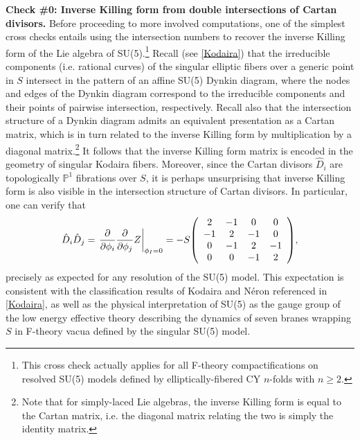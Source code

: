 \documentclass[11pt,oneside,english]{article}
\numberwithin{equation}{section}
\let\originalleft\left
\let\originalright\right
\renewcommand*{\left}{\mathopen{}\mathclose\bgroup\originalleft}
\renewcommand*{\right}{\aftergroup\egroup\originalright}
\theoremstyle{definition}
\begin{document}
\noindent \textbf{Check \#0: Inverse Killing form from double intersections of Cartan divisors.} Before proceeding to more involved computations, one of the simplest cross checks entails using the intersection numbers to recover the inverse Killing form of the Lie algebra of SU(5).\footnote{This cross check actually applies for all F-theory compactifications on resolved SU(5) models defined by elliptically-fibered CY $n$-folds with $n\geq 2$.} Recall (see \cref{Kodaira}) that the irreducible components (i.e. rational curves) of the singular elliptic fibers over a generic point in $S$ intersect in the pattern of an affine SU(5) Dynkin diagram, where the nodes and edges of the Dynkin diagram correspond to the irreducible components and their points of pairwise intersection, respectively. Recall also that the intersection structure of a Dynkin diagram admits an equivalent presentation as a Cartan matrix, which is in turn related to the inverse Killing form by multiplication by a diagonal matrix.\footnote{Note that for simply-laced Lie algebras, the inverse Killing form is equal to the Cartan matrix, i.e. the diagonal matrix relating the two is simply the identity matrix.} It follows that the inverse Killing form matrix is encoded in the geometry of singular Kodaira fibers. Moreover, since the Cartan divisors $\hat D_i$ are topologically $\mathbb P^1$ fibrations over $S$, it is perhaps unsurprising that inverse Killing form is also visible in the intersection structure of Cartan divisors. In particular, one can verify that
	\begin{align}
		 \hat D_{i}  \hat D_j=  \left.\frac{\partial}{\partial \phi_i} \frac{\partial}{\partial \phi_j} Z\right|_{\phi_I=0} =- S\left(
\begin{array}{cccc}
 2 & -1 & 0 & 0 \\
 -1 & 2 & -1 & 0 \\
 0 & -1 & 2 & -1 \\
 0 & 0 & -1 & 2 \\
\end{array}
\right),
	\end{align}
precisely as expected for any resolution of the SU(5) model. This expectation is consistent with the classification results of Kodaira and N\'eron referenced in \cref{Kodaira}, as well as the physical interpretation of SU(5) as the gauge group of the low energy effective theory describing the dynamics of seven branes wrapping $S$ in F-theory vacua defined by the singular SU(5) model.\newline
\end{document}
